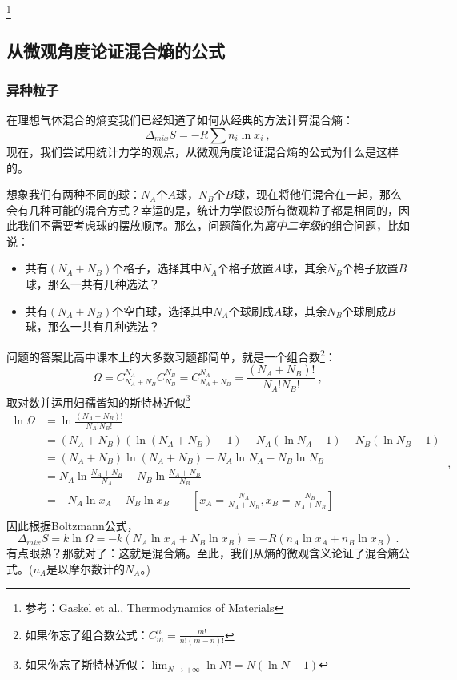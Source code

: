 


\footnote{参考：Gaskel et al., Thermodynamics of Materials}

\subsection{从微观角度论证混合熵的公式}
\subsubsection{异种粒子}
在理想气体混合的熵变我们已经知道了如何从经典的方法计算混合熵：
\begin{equation}
\Delta_{mix} S = - R \sum n_i \ln x_i~,
\end{equation}
现在，我们尝试用统计力学的观点，从微观角度论证混合熵的公式为什么是这样的。

想象我们有两种不同的球：$N_A$个$A$球，$N_B$个$B$球，现在将他们混合在一起，那么会有几种可能的混合方式？幸运的是，统计力学假设所有微观粒子都是相同的，因此我们不需要考虑球的摆放顺序。那么，问题简化为\textsl{高中二年级}的组合问题，比如说：
\begin{itemize}
\item 共有$(N_A+N_B)$个格子，选择其中$N_A$个格子放置$A$球，其余$N_B$个格子放置$B$球，那么一共有几种选法？
\item 共有$(N_A+N_B)$个空白球，选择其中$N_A$个球刷成$A$球，其余$N_B$个球刷成$B$球，那么一共有几种选法？
\end{itemize}
问题的答案比高中课本上的大多数习题都简单，就是一个组合数\footnote{如果你忘了组合数公式：$C^n_m = \frac{m!}{n!(m-n)!}$}：
\begin{equation}
\Omega = C^{N_A}_{N_A+N_B} C^{N_B}_{N_B} =  C^{N_A}_{N_A+N_B}  = \frac{(N_A+N_B)!}{N_A!N_B!}~,
\end{equation}
取对数并运用妇孺皆知的斯特林近似\footnote{如果你忘了斯特林近似：$\lim_{N \to +\infty} \ln N! = N (\ln N -1)$}
\begin{equation}\label{eq_MICMXS_1}
\begin{aligned}
\ln \Omega &= \ln \frac{(N_A+N_B)!}{N_A!N_B!} \\
 &= (N_A+N_B) (\ln (N_A+N_B) - 1) - N_A (\ln N_A - 1) - N_B (\ln N_B - 1) \\
 &= (N_A+N_B) \ln (N_A+N_B) - N_A \ln N_A - N_B \ln N_B \\
 &= N_A \ln \frac{N_A+N_B}{N_A} + N_B \ln \frac{N_A+N_B}{N_B} \\
 &= - N_A \ln x_A - N_B \ln x_B \qquad \left [x_A = \frac{N_A}{N_A+N_B}, x_B = \frac{N_B}{N_A+N_B} \right ]\\
\end{aligned}~,
\end{equation}
因此根据Boltzmann公式，
\begin{equation}
\Delta_{mix} S = k \ln \Omega = - k(N_A \ln x_A + N_B \ln x_B) = - R(n_A \ln x_A + n_B \ln x_B) ~.
\end{equation}
有点眼熟？那就对了：这就是混合熵。至此，我们从熵的微观含义论证了混合熵公式。($n_A$是以摩尔数计的$N_A$。)

